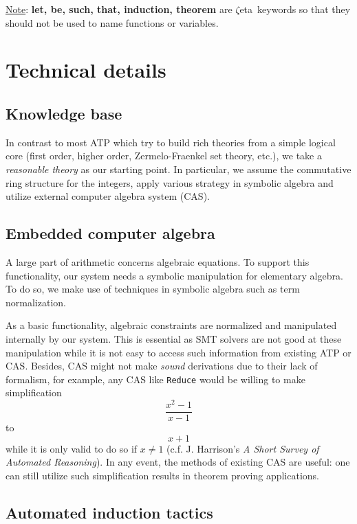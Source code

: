 \documentclass[12pt]{article}
\newcommand{\zetatp}{$\zeta$eta}
\begin{document}
\underline{Note}: \textbf{let, be, such, that, induction, theorem} are \zetatp\ keywords so that they should not be used to name functions or variables.

\section{Technical details}

\subsection{Knowledge base}

In contrast to most ATP which try to build rich theories from a simple logical core (first order, higher order, Zermelo-Fraenkel set theory, etc.), we take a \emph{reasonable theory} as our starting point. In particular, we assume the commutative ring structure for the integers, apply various strategy in symbolic algebra and utilize external computer algebra system (CAS).



\subsection{Embedded computer algebra}

A large part of arithmetic concerns algebraic equations. To support this functionality, our system needs a symbolic manipulation for elementary algebra. To do so, we make use of techniques in symbolic algebra such as term normalization.

As a basic functionality, algebraic constraints are normalized and manipulated internally by our system. This is essential as SMT solvers are not good at these manipulation while it is not easy to access such information from existing ATP or CAS. Besides, CAS might not make \emph{sound} derivations due to their lack of formalism, for example, any CAS like \texttt{Reduce} would be willing to make simplification
$$\frac{x^2-1}{x-1}$$
to
$$x+1$$
while it is only valid to do so if $x \not= 1$ (c.f. J. Harrison's \emph{A Short Survey of Automated Reasoning}). In any event, the methods of existing CAS are useful: one can still utilize such simplification results in theorem proving applications.

\subsection{Automated induction tactics}
\end{document}
